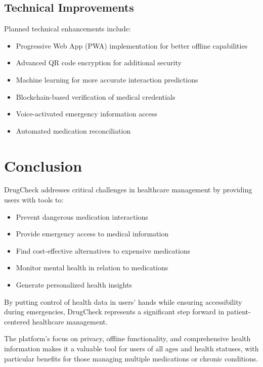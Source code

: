 \documentclass[12pt,a4paper]{report}
\begin{document}
\section{Technical Improvements}
Planned technical enhancements include:
\begin{itemize}
    \item Progressive Web App (PWA) implementation for better offline capabilities
    \item Advanced QR code encryption for additional security
    \item Machine learning for more accurate interaction predictions
    \item Blockchain-based verification of medical credentials
    \item Voice-activated emergency information access
    \item Automated medication reconciliation
\end{itemize}

\chapter{Conclusion}

DrugCheck addresses critical challenges in healthcare management by providing users with tools to:
\begin{itemize}
    \item Prevent dangerous medication interactions
    \item Provide emergency access to medical information
    \item Find cost-effective alternatives to expensive medications
    \item Monitor mental health in relation to medications
    \item Generate personalized health insights
\end{itemize}

By putting control of health data in users' hands while ensuring accessibility during emergencies, DrugCheck represents a significant step forward in patient-centered healthcare management.

The platform's focus on privacy, offline functionality, and comprehensive health information makes it a valuable tool for users of all ages and health statuses, with particular benefits for those managing multiple medications or chronic conditions.
\end{document}
